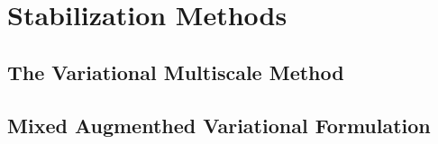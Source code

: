 \documentclass[../Dissertation]{subfiles}
\begin{document}
\section{Stabilization Methods}\label{sec:stab_methods}
\vspace{-1ex}
\subsection{The Variational Multiscale Method}\label{subsec:VMS_method}
\subsection{Mixed Augmenthed Variational Formulation}\label{ss:MVAF}
    
    \lipsum[64-71]
    
    
\end{document}
